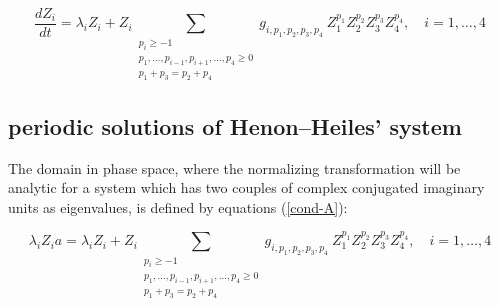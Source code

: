 \begin{equation}
\label{heiles-normal}
\frac{dZ_i}{dt} = \lambda_iZ_i + Z_i
                                   \!\!\!\!\!\!\!\!\!\!\!\!\!\!\!\!\!
                                   \!\!\!\!\!\!\!\!\!\!\!\!\!\!\!\!\!
                                    \sum_{\begin{array}{c}
                                    p_i \geq -1 \\
                           p_1,\ldots,p_{i-1},p_{i+1},\ldots,p_4 \geq 0 \\
                                       p_1 + p_3 = p_2 + p_4
                                          \end{array}}
                                   \!\!\!\!\!\!\!\!\!\!\!\!\!\!\!\!
                                   \!\!\!\!\!\!\!\!\!\!\!\!\!\!\!\!
                                    g_{i,p_1,p_2,p_3,p_4}
                           \ Z_1^{p_1}Z_2^{p_2}Z_3^{p_3}Z_4^{p_4},
\quad i=1,\ldots ,4
\end{equation}

 \subsection{periodic solutions of Henon--Heiles' system}

   The domain in phase space, where the normalizing transformation  will
be analytic for a system which has two couples of complex conjugated 
imaginary units as eigenvalues, is defined by equations 
(\ref{cond-A}):

\begin{equation}
\label{heiles-condition}
\lambda_iZ_i a = \lambda_iZ_i + Z_i
                                   \!\!\!\!\!\!\!\!\!\!\!\!\!\!\!\!\!
                                   \!\!\!\!\!\!\!\!\!\!\!\!\!\!\!\!\!
                                   \sum_{\begin{array}{c}
                                    p_i \geq -1 \\
                           p_1,\ldots,p_{i-1},p_{i+1},\ldots,p_4 \geq 0 \\
                                       p_1 + p_3 = p_2 + p_4
                                          \end{array}}
                                   \!\!\!\!\!\!\!\!\!\!\!\!\!\!\!\!
                                   \!\!\!\!\!\!\!\!\!\!\!\!\!\!\!\!
                                    g_{i,p_1,p_2,p_3,p_4}
                           \ Z_1^{p_1}Z_2^{p_2}Z_3^{p_3}Z_4^{p_4},
\quad i=1,\ldots ,4
\end{equation}

